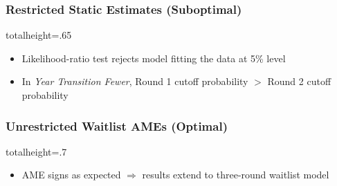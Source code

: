 \documentclass[12pt, aspectratio=169]{beamer}
\begin{document}
\begin{frame}[label=ysres]
\frametitle{Restricted Static Estimates (Suboptimal)}
\addtocounter{framenumber}{-1}
\vspace{-5pt}
\begin{table}[htbp]
  \centering
  \begin{adjustbox}{totalheight=.65\textheight}

  \end{adjustbox}
\end{table}%
\begin{itemize}
\item Likelihood-ratio test rejects model fitting the data at 5\% level
\vspace{1.25pt}
\item In \textit{Year Transition Fewer}, Round 1 cutoff probability $>$ Round 2 cutoff probability
\vspace{1.25pt}
\end{itemize}
\hyperlink{fysres}{}
\hyperlink{ydres}{}
\end{frame}

\begin{frame}[label=wdueo]
\frametitle{Unrestricted Waitlist AMEs (Optimal)}
\begin{table}[htbp]
  \centering
  \begin{adjustbox}{totalheight=.7\textheight}

  \end{adjustbox}
\end{table}%
\begin{itemize}
\item AME signs as expected $\Rightarrow$ results extend to three-round waitlist model
\end{itemize}
\hyperlink{fwdueo}{}
\hyperlink{wsso}{}
\hyperlink{whreo}{}
\end{frame}
\end{document}
